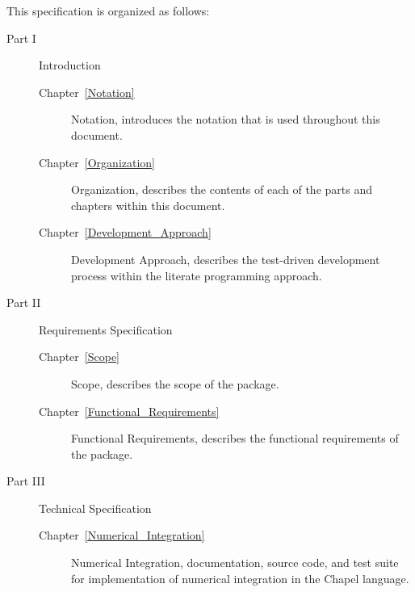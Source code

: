 \label{Organization}

This specification is organized as follows:

\begin{description}
\item[Part I] Introduction

\begin{description}

\item[Chapter~\ref{Notation}] Notation, introduces the notation that is used
throughout this document.


\item[Chapter~\ref{Organization}] Organization, describes the contents of
each of the parts and chapters within this document.

\item[Chapter~\ref{Development_Approach}] Development Approach, describes 
the test-driven development process within the literate programming approach.
\end{description}

\item[Part II] Requirements Specification

\begin{description}
\item[Chapter~\ref{Scope}] Scope, describes the scope of the package.
\end{description}

\begin{description}
\item[Chapter~\ref{Functional_Requirements}] Functional Requirements, describes the 
functional requirements of the package.
\end{description}

\item[Part III] Technical Specification

\begin{description}
\item[Chapter~\ref{Numerical_Integration}] Numerical Integration, documentation, source
code, and test suite for implementation of numerical integration in the Chapel language.
\end{description}


\end{description}
